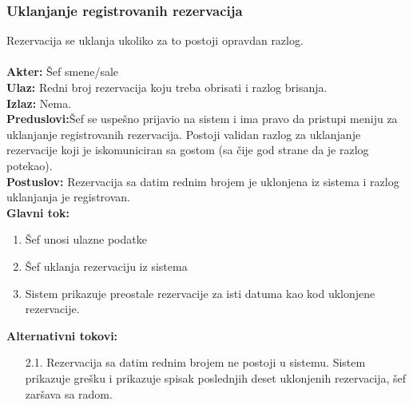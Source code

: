 \documentclass{article}
\begin{document}
\subsubsection{Uklanjanje registrovanih rezervacija}
Rezervacija se uklanja ukoliko za to postoji opravdan razlog.\\\\
\textbf{Akter:} Šef smene/sale\\
\textbf{Ulaz:} Redni broj rezervacija koju treba obrisati i razlog brisanja.\\
\textbf{Izlaz:} Nema.\\
\textbf{Preduslovi:}Šef se uspešno prijavio na sistem i ima pravo da pristupi meniju za uklanjanje registrovanih rezervacija. Postoji validan razlog za uklanjanje rezervacije koji je iskomuniciran sa gostom (sa čije god strane da je razlog potekao).\\
\textbf{Postuslov:} Rezervacija sa datim rednim brojem je uklonjena iz sistema i razlog uklanjanja je registrovan.\\
\textbf{Glavni tok:}
\begin{enumerate}
\item Šef unosi ulazne podatke
\item Šef uklanja rezervaciju iz sistema
\item Sistem prikazuje preostale rezervacije za isti datuma kao kod uklonjene rezervacije.\\
\end{enumerate}
\textbf{Alternativni tokovi:}\\
\begin{itemize}
\item [2.1.] Rezervacija sa datim rednim brojem ne postoji u sistemu. Sistem prikazuje grešku i prikazuje spisak poslednjih deset uklonjenih rezervacija, šef zaršava sa radom.
\end{itemize}
\end{document}
